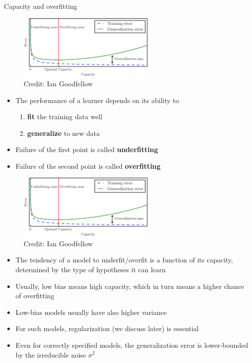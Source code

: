 \documentclass[11pt,compress,t,notes=noshow, xcolor=table]{beamer}
\begin{document}
\begin{vbframe}{Capacity and overfitting}

  \begin{figure}
    \centering
    \includegraphics[width = 0.6\textwidth]{figure_man/lcurve_1.png}
    \tiny{\\ Credit: Ian Goodfellow}
  \end{figure}
  

\begin{itemize}
  \item 
    The performance of a learner depends on its ability to 
    \begin{enumerate}
      \item \textbf{fit} the training data well
      \item \textbf{generalize} to new data
    \end{enumerate}  
  \item Failure of the first point is called \textbf{underfitting}
  \item Failure of the second point is called \textbf{overfitting}
\end{itemize}  


\framebreak

\begin{figure}
  \centering
  \includegraphics[width = 0.6\textwidth]{figure_man/lcurve_1.png}
  \tiny{\\ Credit: Ian Goodfellow}
\end{figure}


\begin{itemize}
  \item The tendency of a model to underfit/overfit is a function of its capacity, determined by the type of hypotheses it can learn
  \item Usually, low bias means high capacity, which in turn means a higher chance of overfitting
  \item Low-bias models usually have 
  also higher variance
  \item For such models, regularization (we discuss later) is essential
  \item Even for correctly specified models, the generalization error is lower-bounded by the irreducible noise $\sigma^2$
\end{itemize}
\end{vbframe}
\end{document}
